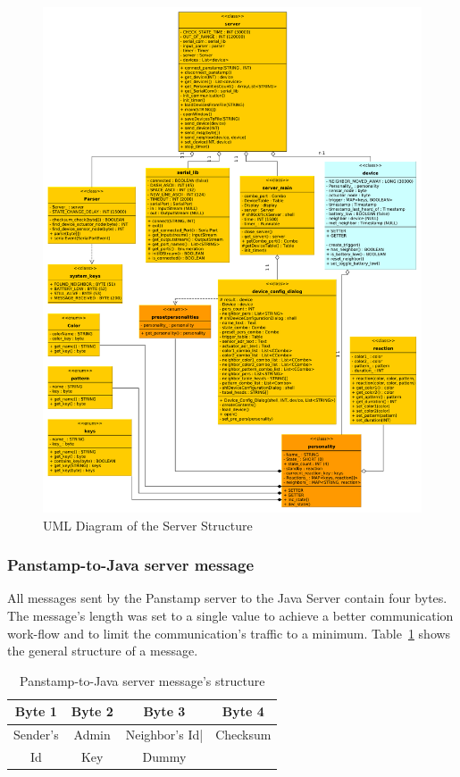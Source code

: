\begin{figure}[ht]
	\centerline{\includegraphics[width=\textwidth]{./graph/general.pdf}}
	\caption{UML Diagram of the Server Structure}
	\label{fig:server_uml}
\end{figure}


\subsubsection{Panstamp-to-Java server message}
\label{sec:Panstamp-to-Java server message}
All messages sent by the Panstamp server to the Java Server contain four bytes. The message's length was set to a single value to achieve a better communication work-flow and to limit the communication's traffic to a minimum. Table~\ref{Panstamp-to-Java} shows the general structure of a message.


\begin{table}[h]
  \centering
  \begin{tabular}{ c | c | c | c }
    \hline
    \textbf{Byte 1} & \textbf{Byte 2} & \textbf{Byte 3} & \textbf{Byte 4} \\ [0.5ex]    
    \hline
    Sender's & Admin & Neighbor's Id| & Checksum  \\
    Id & Key & Dummy & \\
    \hline
  \end{tabular}
  \caption[Pamstamp-to-Java]%
          {Panstamp-to-Java server message's structure}
  \label{Panstamp-to-Java}
\end{table}

